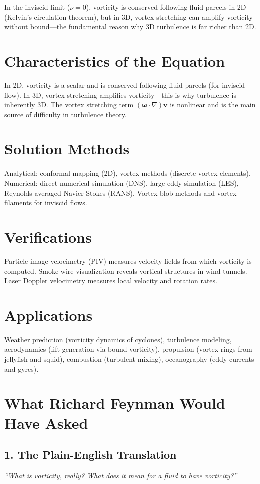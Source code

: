 In the inviscid limit ($\nu = 0$), vorticity is conserved following fluid parcels in 2D (Kelvin's circulation theorem), but in 3D, vortex stretching can amplify vorticity without bound---the fundamental reason why 3D turbulence is far richer than 2D.

\section*{Characteristics of the Equation}

In 2D, vorticity is a scalar and is conserved following fluid parcels (for inviscid flow). In 3D, vortex stretching amplifies vorticity---this is why turbulence is inherently 3D. The vortex stretching term $(\boldsymbol{\omega} \cdot \nabla)\mathbf{v}$ is nonlinear and is the main source of difficulty in turbulence theory.
\section*{Solution Methods}

Analytical: conformal mapping (2D), vortex methods (discrete vortex elements). Numerical: direct numerical simulation (DNS), large eddy simulation (LES), Reynolds-averaged Navier-Stokes (RANS). Vortex blob methods and vortex filaments for inviscid flows.
\section*{Verifications}

Particle image velocimetry (PIV) measures velocity fields from which vorticity is computed. Smoke wire visualization reveals vortical structures in wind tunnels. Laser Doppler velocimetry measures local velocity and rotation rates.
\section*{Applications}

Weather prediction (vorticity dynamics of cyclones), turbulence modeling, aerodynamics (lift generation via bound vorticity), propulsion (vortex rings from jellyfish and squid), combustion (turbulent mixing), oceanography (eddy currents and gyres).
\section*{What Richard Feynman Would Have Asked}

\subsection*{1. The Plain-English Translation}
\textit{``What is vorticity, really? What does it mean for a fluid to have vorticity?''}

